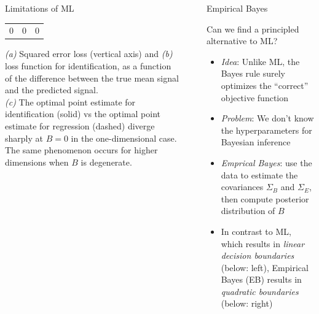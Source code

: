 \documentclass[final]{beamer}
\newlength{\sepwid}
\newlength{\onecolwid}
\begin{document}
\begin{frame}[t]
\begin{columns}[t]
\begin{column}{\onecolwid}
\begin{block}{Limitations of ML}
\begin{center}
\begin{tabular}{ccc}
{\small 0} & {\small 0} & {\small 0}\\
\end{tabular}
\end{center}
{\small
\emph{(a)} Squared error loss (vertical axis) and \emph{(b)} loss function for identification,
as a function of the difference between the true mean signal and the predicted signal.\\
\emph{(c)} The optimal point estimate for identification (solid) vs the optimal point estimate for regression (dashed)
diverge sharply at $B = 0$ in the one-dimensional case.  The same phenomenon occurs for higher dimensions when $B$ is degenerate.
}
\end{block}






\end{column} %

\begin{column}{\sepwid}\end{column} %


\begin{column}{\onecolwid}

\begin{block}{Empirical Bayes}

Can we find a principled alternative to ML?

\begin{itemize}
\item \emph{Idea}: Unlike ML, the Bayes rule surely optimizes the ``correct'' objective function
\item \emph{Problem}: We don't know the hyperparameters for Bayesian inference
\item \emph{Emprical Bayes}: use the data to estimate the covariances
$\Sigma_B$ and $\Sigma_E$, then compute posterior distribution of $B$
\item In contrast to ML, which results in \emph{linear decision
  boundaries} (below: left), Empirical Bayes (EB) results in \emph{quadratic boundaries} (below: right)
\end{itemize}


\end{block}
\end{column}
\end{columns}
\end{frame}
\end{document}
